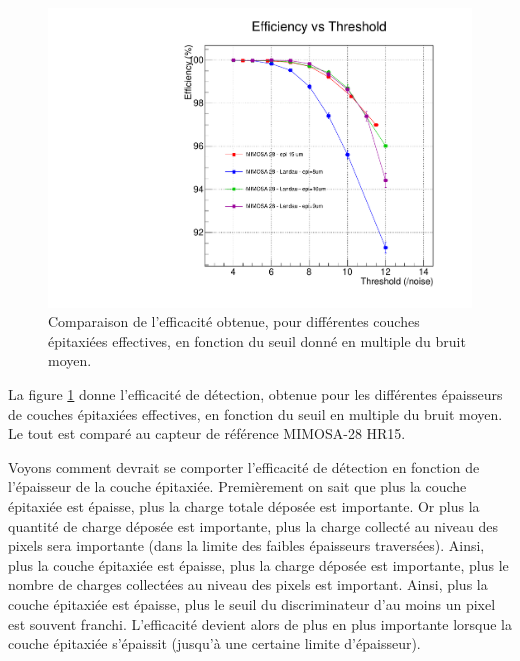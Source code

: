   \medskip
   
   \begin{figure}[!htb]
    \begin{center} 
     \includegraphics[scale=0.49]{./figures/Plots_resultat_simu/G4_landau_comparison_eff.pdf}
     \caption{Comparaison de l'efficacit\'e obtenue, pour diff\'erentes couches épitaxiées effectives, en fonction du seuil donn\'e en multiple du bruit moyen.}
     \label{fig:comp_landau_eff}
    \end{center}
   \end{figure}
   
   La figure \ref{fig:comp_landau_eff} donne l'efficacit\'e de d\'etection, obtenue pour les diff\'erentes \'epaisseurs de couches épitaxiées effectives, en fonction du seuil en multiple du bruit moyen. Le tout est compar\'e au capteur de r\'ef\'erence MIMOSA-28 HR15. 
   
   \medskip
   
   Voyons comment devrait se comporter l'efficacit\'e de d\'etection en fonction de l'\'epaisseur de la couche \'epitaxi\'ee. Premi\`erement on sait que plus la couche \'epitaxi\'ee est \'epaisse, plus la charge totale d\'epos\'ee est importante. Or plus la quantit\'e de charge d\'epos\'ee est importante, plus la charge collect\'e au niveau des pixels sera importante (dans la limite des faibles \'epaisseurs travers\'ees). Ainsi, plus la couche \'epitaxi\'ee est \'epaisse, plus la charge d\'epos\'ee est importante, plus le nombre de charges collect\'ees au niveau des pixels est important. Ainsi, plus la couche \'epitaxi\'ee est \'epaisse, plus le seuil du discriminateur d'au moins un pixel est souvent franchi. L'efficacit\'e devient alors de plus en plus importante lorsque la couche \'epitaxi\'ee s'\'epaissit (jusqu'\`a une certaine limite d'\'epaisseur).
   
